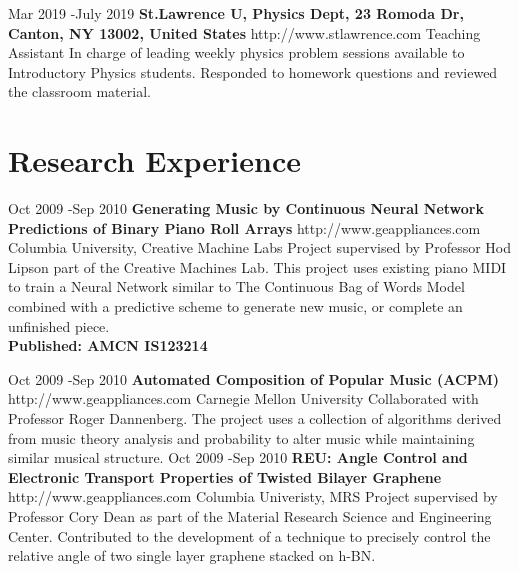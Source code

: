 \documentclass[10pt]{article} %
\begin{document}
\job
{Mar 2019 -}{July 2019}
{\bf{St.Lawrence U, Physics Dept}, \textnormal{23 Romoda Dr, Canton, NY 13002, United States}}
{http://www.stlawrence.com}
{Teaching Assistant}
{In charge of leading weekly physics problem sessions available to Introductory Physics students. Responded to homework questions and reviewed the classroom material. }


\section{Research Experience}

\job
{Oct 2009 -}{Sep 2010}
{\bf{Generating Music by Continuous Neural Network Predictions of Binary Piano Roll Arrays}}
{http://www.geappliances.com}
{Columbia University, Creative Machine Labs}
{Project supervised by Professor Hod Lipson part of the Creative Machines Lab. This project uses existing piano MIDI to train a Neural Network similar to The Continuous Bag of Words Model combined with a predictive scheme to generate new music, or complete an unfinished piece.
\\

\bf{Published: AMCN IS123214}}


\job
{Oct 2009 -}{Sep 2010}
{\bf{Automated Composition of Popular Music (ACPM) 
}}
{http://www.geappliances.com}
{Carnegie Mellon University}
{Collaborated with Professor Roger Dannenberg.  The project uses a collection of algorithms derived from music theory analysis and probability to alter music while maintaining similar musical structure.}
\job
{Oct 2009 -}{Sep 2010}
{\bf{REU: Angle Control and Electronic Transport Properties of Twisted Bilayer Graphene}}
{http://www.geappliances.com}
{Columbia Univeristy, MRS}
{Project supervised by Professor Cory Dean as part of the Material Research Science and Engineering Center. Contributed to the development of a technique to precisely control the relative angle of two single layer graphene stacked on h-BN.}

%
%
%
%
%
\end{document}
